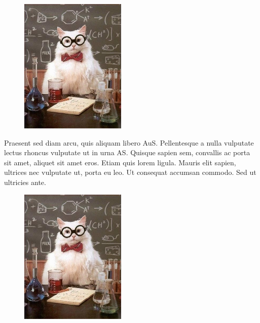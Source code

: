 \begin{figure}[thb]
	\centering
		\includegraphics[width=0.45\textwidth]{figures/example.jpg}
	\label{fig:fig2}
\end{figure}

Praesent sed diam arcu, quis aliquam libero \ac{AuS}. Pellentesque a nulla vulputate lectus rhoncus vulputate ut in urna \ac{AS}. Quisque sapien sem, convallis ac porta sit amet, aliquet sit amet eros. Etiam quis lorem ligula. Mauris elit sapien, ultrices nec vulputate ut, porta eu leo. Ut consequat accumsan commodo. Sed ut ultricies ante.

\begin{figure}[thb]
	\centering
		\includegraphics[width=0.45\textwidth]{figures/example.jpg}
	\label{fig:fig3}
\end{figure}

